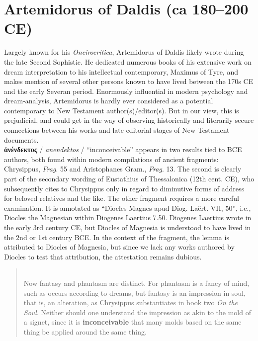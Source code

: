 %
%
\chapter{Artemidorus of Daldis (ca 180--200 CE)}%
\vspace*{3mm}
\justifying
%
\noindent{}Largely known for his \textit{Oneirocritica}, %
Artemidorus of Daldis likely wrote during the late Second Sophistic. %
He dedicated numerous books of his extensive work on dream interpretation %
to his intellectual contemporary, Maximus of Tyre, %
and makes mention of several other persons known to have lived between the 170s CE and %
the early Severan period. %
Enormously influential in modern psychology and dream-analysis, Artemidorus is hardly ever %
considered as a potential contemporary to New Testament author(s)/editor(s). %
But in our view, this is prejudicial, and could get in the way of observing %
historically and literarily secure connections between his works %
and late editorial stages of New Testament documents. \\[1.5mm] %

\noindent{}\textbf{ἀνένδεκτος} / \textit{anendektos} / “inconceivable” %
appears in two results tied to BCE authors, %
both found within  modern compilations of ancient fragments: 
Chrysippus, \textit{Frag}. 55 and Aristophanes Gram., \textit{Frag}. 13. %
The second is clearly part of the secondary wording of Eustathius of Thessalonica (12th cent. CE), %
who subsequently cites to Chrysippus only in regard to diminutive forms of address for beloved relatives and the like. %
The other fragment requires a more careful examination. %
It is annotated as “Diocles Magnes apud Diog. Laërt. VII, 50”, %
i.e., Diocles the Magnesian within Diogenes Laertius 7.50. %
Diogenes Laertius wrote in the early 3rd century CE, %
but Diocles of Magnesia is understood to have lived in the 2nd or 1st century BCE. %
In the context of the fragment, the lemma is attributed to Diocles of Magnesia, %
but since we lack any works authored by Diocles to test that attribution, %
the attestation remains dubious. %
\clearpage
 \begin{quote} \\[1mm] %
 Now fantasy and phantasm are distinct. %
 For phantasm is a fancy of mind, such as occurs according to dreams, %
 but fantasy is an impression in soul, that is, an alteration, %
 as Chrysippus substantiates in book two \textit{On the Soul}. %
 Neither should one understand the impression as akin to the mold of a signet, %
 since it is \textbf{inconceivable} that many molds based on the same thing %
 be applied around the same thing. %
 \end{quote} %
 \vspace*{2mm}

